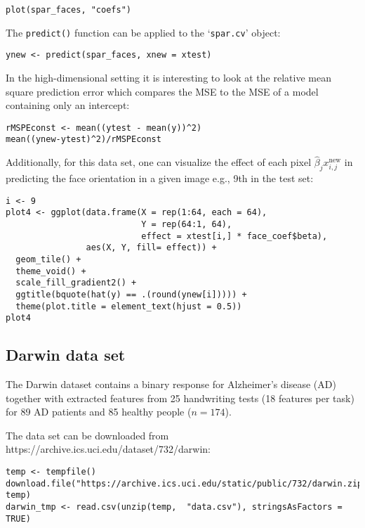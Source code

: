 \documentclass[
  article]{jss}
\begin{document}
\begin{verbatim}
plot(spar_faces, "coefs")
\end{verbatim}

The \texttt{predict()} function can be applied to the `\texttt{spar.cv}'
object:

\begin{verbatim}
ynew <- predict(spar_faces, xnew = xtest)
\end{verbatim}

In the high-dimensional setting it is interesting to look at the
relative mean square prediction error which compares the MSE to the MSE
of a model containing only an intercept:

\begin{verbatim}
rMSPEconst <- mean((ytest - mean(y))^2) 
mean((ynew-ytest)^2)/rMSPEconst
\end{verbatim}

Additionally, for this data set, one can visualize the effect of each
pixel \(\hat\beta_j x^\text{new}_{i,j}\) in predicting the face
orientation in a given image e.g., 9th in the test set:

\begin{verbatim}
i <- 9
plot4 <- ggplot(data.frame(X = rep(1:64, each = 64),
                           Y = rep(64:1, 64),
                           effect = xtest[i,] * face_coef$beta), 
                aes(X, Y, fill= effect)) +
  geom_tile() +
  theme_void() +
  scale_fill_gradient2() +
  ggtitle(bquote(hat(y) == .(round(ynew[i])))) +
  theme(plot.title = element_text(hjust = 0.5)) 
plot4
\end{verbatim}

\subsection{Darwin data set}\label{darwin-data-set}

The Darwin dataset \citep{CILIA2022darwin} contains a binary response
for Alzheimer's disease (AD) together with extracted features from 25
handwriting tests (18 features per task) for 89 AD patients and 85
healthy people (\(n=174\)).

The data set can be downloaded from
https://archive.ics.uci.edu/dataset/732/darwin:

\begin{verbatim}
temp <- tempfile()
download.file("https://archive.ics.uci.edu/static/public/732/darwin.zip", temp)
darwin_tmp <- read.csv(unzip(temp,  "data.csv"), stringsAsFactors = TRUE)
\end{verbatim}
\end{document}
